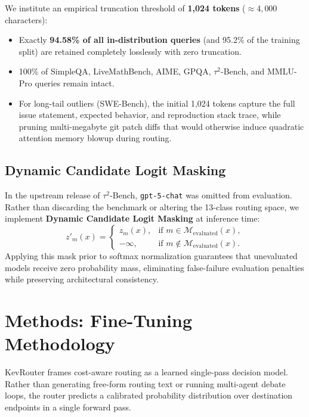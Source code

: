 \documentclass[11pt,a4paper]{article}
\begin{document}
We institute an empirical truncation threshold of \textbf{1,024 tokens} ($\approx 4,000$ characters):
\begin{itemize}
    \item Exactly \textbf{94.58\% of all in-distribution queries} (and 95.2\% of the training split) are retained completely losslessly with zero truncation.
    \item 100\% of SimpleQA, LiveMathBench, AIME, GPQA, $\tau^2$-Bench, and MMLU-Pro queries remain intact.
    \item For long-tail outliers (SWE-Bench), the initial 1,024 tokens capture the full issue statement, expected behavior, and reproduction stack trace, while pruning multi-megabyte git patch diffs that would otherwise induce quadratic attention memory blowup during routing.
\end{itemize}

\subsection{Dynamic Candidate Logit Masking}
\label{subsec:candidate_masking}

In the upstream release of $\tau^2$-Bench, \texttt{gpt-5-chat} was omitted from evaluation. Rather than discarding the benchmark or altering the 13-class routing space, we implement \textbf{Dynamic Candidate Logit Masking} at inference time:
\begin{equation}
z'_m(x) = \begin{cases} 
z_m(x), & \text{if } m \in \mathcal{M}_{\text{evaluated}}(x), \\ 
-\infty, & \text{if } m \notin \mathcal{M}_{\text{evaluated}}(x). 
\end{cases}
\end{equation}
Applying this mask prior to softmax normalization guarantees that unevaluated models receive zero probability mass, eliminating false-failure evaluation penalties while preserving architectural consistency.

\section{Methods: Fine-Tuning Methodology}
\label{sec:methods}

KevRouter frames cost-aware routing as a learned single-pass decision model. Rather than generating free-form routing text or running multi-agent debate loops, the router predicts a calibrated probability distribution over destination endpoints in a single forward pass.
\end{document}
